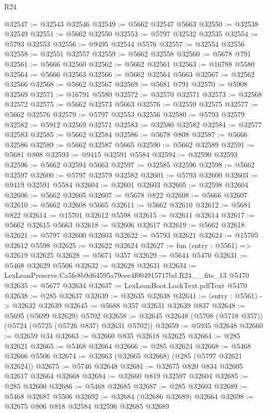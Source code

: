 \begin{lexlean}{R24}
\begin{coremodule}
@32547 := @32543 @32546
@32549 := @5662 @32547 @5663
@32550 := @32538 @32549
@32551 := @5662 @32550
@32553 := @5797 @32532 @32535
@32554 := @5793 @32553
@32556 := @9495 @32544 @5576
@32557 := @32554 @32556
@32558 := @32551 @32557
@32559 := @5662 @32558
@32560 := @5678 @791
@32561 := @5666 @32560
@32562 := @5662 @32561
@32563 := @16788 @5580
@32564 := @5666 @32563
@32566 := @5662 @32564 @5663
@32567 := @32562 @32566
@32568 := @5662 @32567
@32569 := @5681 @791
@32570 := @5908 @32569
@32571 := @16791 @5580
@32572 := @32570 @32571
@32573 := @32568 @32572
@32575 := @5662 @32573 @5663
@32576 := @32559 @32575
@32577 := @5662 @32576
@32579 := @5797 @32553 @32556
@32580 := @5793 @32579
@32582 := @5912 @32569 @32571
@32583 := @32580 @32582
@32584 := @32577 @32583
@32585 := @5662 @32584
@32586 := @5678 @808
@32587 := @5666 @32586
@32589 := @5662 @32587 @5665
@32590 := @5662 @32589
@32591 := @5681 @808
@32593 := @9415 @32591 @5584
@32594 := @32590 @32593
@32596 := @5662 @32594 @5663
@32597 := @32585 @32596
@32598 := @5662 @32597
@32600 := @5797 @32579 @32582
@32601 := @5793 @32600
@32603 := @9419 @32591 @5584
@32604 := @32601 @32603
@32605 := @32598 @32604
@32606 := @5662 @32605
@32607 := @5678 @822
@32608 := @5666 @32607
@32610 := @5662 @32608 @5665
@32611 := @5662 @32610
@32612 := @5681 @822
@32614 := @15701 @32612 @5598
@32615 := @32611 @32614
@32617 := @5662 @32615 @5663
@32618 := @32606 @32617
@32619 := @5662 @32618
@32621 := @5797 @32600 @32603
@32622 := @5793 @32621
@32624 := @15705 @32612 @5598
@32625 := @32622 @32624
@32627 := fun (entry : @5561) => @32619 @32625
@32628 := @5671 @357
@32629 := @5644 @5470
@32631 := @5468 @32629 @5506
@32632 := @32628 @32631
@32634 := LexLeanPreserve.Ca5fe8b9d64595a79eee4f004915717bd.R24.__fits_13 @5470
@32635 := @5677 @32634
@32637 := LexLeanBoot.LockText.pdfText @5470
@32638 := @285 @32637
@32639 := @32635 @32638
@32641 := (entry : @5561) -> @32632 @32639
@32645 := @5688 @357 @32631 @32639 @837
@32648 := @5695 (@5699 @32629) @5702
@32658 := @32645 @32648 (@5708 (@5718 @357)) (@5724 (@5725 (@5726 @837) @32631 @5702))
@32659 := @5935 @32648
@32660 := @32659 @34
@32663 := @32660 @835 @32618 @32625
@32664 := @285 @32621
@32665 := @5468 @32664
@32666 := @285 @32624
@32668 := @5468 @32666 @5506
@32674 := @32663 (@32665 @32668) (@285 (@5797 @32621 @32624))
@32675 := @5746 @32648
@32681 := @32675 @820 @834 @32605 @32617 @32664 @32668
@32684 := @32660 @819 @32597 @32604
@32685 := @285 @32600
@32686 := @5468 @32685
@32687 := @285 @32603
@32689 := @5468 @32687 @5506
@32692 := @32684 (@32686 @32689) @32664
@32698 := @32675 @806 @818 @32584 @32596 @32685 @32689

\end{coremodule}
\end{lexlean}
